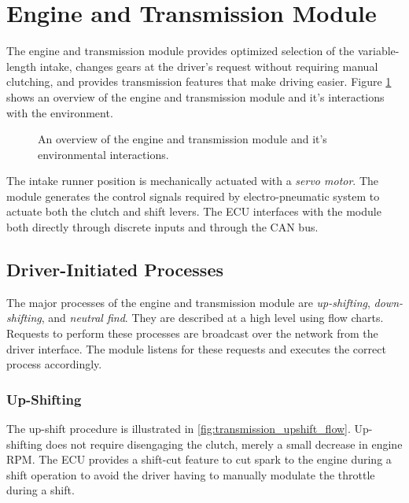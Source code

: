 \section{Engine and Transmission Module}

The engine and transmission module provides optimized selection of the variable-length intake, changes gears at the driver's request without requiring manual clutching, and provides transmission features that make driving easier. Figure \ref{fig:design_engine_overview_block} shows an overview of the engine and transmission module and it's interactions with the environment.

\begin{figure}[H]
	\centering
 	
	\caption{An overview of the engine and transmission module and it's environmental interactions.}
	\label{fig:design_engine_overview_block}
\end{figure}

The intake runner position is mechanically actuated with a \emph{servo motor}. The module generates the control signals required by electro-pneumatic system to actuate both the clutch and shift levers. The ECU interfaces with the module both directly through discrete inputs and through the CAN bus.

\subsection{Driver-Initiated Processes}

The major processes of the engine and transmission module are \emph{up-shifting}, \emph{down-shifting}, and \emph{neutral find}. They are described at a high level using flow charts. Requests to perform these processes are broadcast over the network from the driver interface. The module listens for these requests and executes the correct process accordingly.

\subsubsection{Up-Shifting}

The up-shift procedure is illustrated in \ref{fig:transmission_upshift_flow}. Up-shifting does not require disengaging the clutch, merely a small decrease in engine RPM. The ECU provides a shift-cut feature to cut spark to the engine during a shift operation to avoid the driver having to manually modulate the throttle during a shift.

